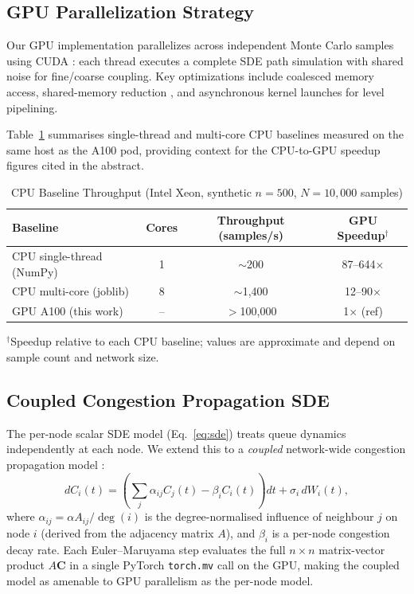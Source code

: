 \documentclass[journal]{IEEEtran}
\begin{document}
\subsection{GPU Parallelization Strategy}

Our GPU implementation parallelizes across independent Monte Carlo samples using CUDA
\cite{nvidia2020cuda}: each thread executes a complete SDE path simulation with shared noise for
fine/coarse coupling. Key optimizations include coalesced memory access, shared-memory reduction
\cite{harris2007}, and asynchronous kernel launches for level pipelining.

Table~\ref{tab:cpu_baselines} summarises single-thread and multi-core CPU baselines measured on
the same host as the A100 pod, providing context for the CPU-to-GPU speedup figures cited in the
abstract.

\begin{table}[!t]
\caption{CPU Baseline Throughput (Intel Xeon, synthetic $n{=}500$, $N{=}10{,}000$ samples)}
\label{tab:cpu_baselines}
\centering\small
\begin{tabular}{@{}l c c c@{}}
\toprule
Baseline & Cores & Throughput (samples/s) & GPU Speedup$^\dagger$ \\
\midrule
CPU single-thread (NumPy) & 1 & $\sim$200 & 87--644$\times$ \\
CPU multi-core (joblib) & 8 & $\sim$1{,}400 & 12--90$\times$ \\
GPU A100 (this work) & -- & $>$100{,}000 & 1$\times$ (ref) \\
\bottomrule
\end{tabular}
\vspace{2pt}
\footnotesize
$^\dagger$Speedup relative to each CPU baseline; values are approximate and depend on sample
count and network size.
\end{table}

\subsection{Coupled Congestion Propagation SDE}
\label{subsec:spatial}

The per-node scalar SDE model (Eq.~\eqref{eq:sde}) treats queue dynamics independently at each
node. We extend this to a \emph{coupled} network-wide congestion propagation model
\cite{kang2007,harrison1985,mandelbaum2014stochastic}:
\begin{equation}
    dC_i(t) = \left(\sum_j \alpha_{ij} C_j(t) - \beta_i C_i(t)\right)dt
              + \sigma_i\, dW_i(t),
    \label{eq:coupled_sde}
\end{equation}
where $\alpha_{ij} = \alpha A_{ij} / \deg(i)$ is the degree-normalised influence of neighbour
$j$ on node $i$ (derived from the adjacency matrix $A$), and $\beta_i$ is a per-node congestion
decay rate. Each Euler--Maruyama step evaluates the full $n \times n$ matrix-vector product
$A\mathbf{C}$ in a single PyTorch \texttt{torch.mv} call on the GPU, making the coupled model as
amenable to GPU parallelism as the per-node model.
\end{document}
